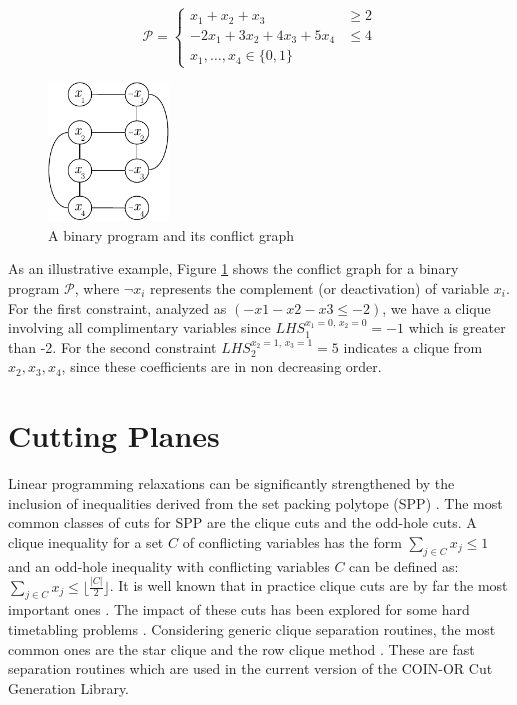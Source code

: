 \documentclass{endm}
\begin{document}
\begin{figure}[h]
\begin{minipage}[b]{.5\textwidth}
\[
\mathcal{P} = \left\{
\begin{array}{lr}
x_1+x_2+x_3 & \geq 2 \\
-2x_{1}+3x_{2}+4x_{3}+5x_{4} & \leq 4 \\
x_{1},\ldots,x_{4}\in\{0,1\}
\end{array}
\right.
\]

\end{minipage}
\begin{minipage}{.5\textwidth}
	\centering
	\includegraphics[width=3.2cm]{cGraph.pdf}
\end{minipage}
\caption{A binary program and its conflict graph}\label{graph}
\end{figure}


As an illustrative example, Figure \ref{graph} shows the conflict graph for a binary program $\mathcal{P}$, where $\neg x_i$ represents the complement (or deactivation) of variable $x_i$.  For the first constraint, analyzed as $(-x1-x2-x3\leq-2)$, we have a clique involving all complimentary variables since $LHS_1^{x_1=0,\, x_2=0}=-1$ which is greater than -2. For the second constraint $LHS_2^{x_2=1,\, x_3=1}=5$ indicates a clique from $x_2,x_3,x_4$, since these coefficients are in non decreasing order.

\section{Cutting Planes}\label{cut}

Linear programming relaxations can be significantly strengthened by the inclusion of inequalities derived from the set packing polytope (SPP) \cite {Padberg1973}. The most common classes of cuts for SPP are the clique cuts and the odd-hole cuts. A clique inequality for a set $C$ of conflicting variables has the form $\sum_{j\in C}x_{j} \leq 1$ and an odd-hole inequality with conflicting variables $C$ can be defined as: $\sum_{j\in C}x_{j} \leq \lfloor \frac{|C|}{2}\rfloor$. It is well known that in practice clique cuts are by far the most important ones \cite{Borndorfer1998}. The impact of these cuts has been explored for some hard timetabling problems \cite{Avella2005,Marecek2012}. Considering generic clique separation routines, the most common ones are the star clique and the row clique method \cite{Eso1999a,Hoffman1993,Borndorfer1998}. These are fast separation routines which are used in the current version of the COIN-OR Cut Generation Library.  
\end{document}
